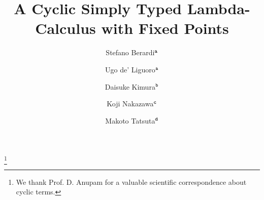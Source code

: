 \documentclass[twoside,11pt]{entics}
\begin{document}
\begin{frontmatter}

  \title{A Cyclic Simply Typed Lambda-Calculus with Fixed Points} 
 \thanks[ALL]{We thank Prof. D. Anupam for a valuable scientific correspondence about cyclic terms.}   %
  \author{Stefano Berardi$^{\tt a}$}	%
   \author{Ugo de' Liguoro$^{\tt a}$}		%
    \author{Daisuke Kimura$^{\tt b}$}
      \author{Koji Nakazawa$^{\tt c}$}
       \author{Makoto Tatsuta$^{\tt d}$}
   \address[a]{C.S. Dept., Turin University, Torino, Italy}  							
   \address[b]{Department of Information Science, Toho University, Japan} 
   \address[c]{Graduate School of Informatics, Nagoya University, Japan}
   \address[d]{National Institute of Informatics, Sokendai, Tokyo, Japan}
 
 


\end{frontmatter}
\end{document}
